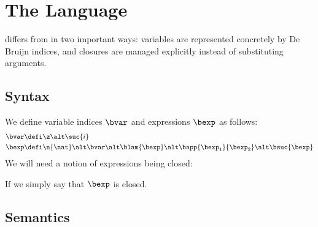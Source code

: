 \section{The \textnormal{\blang} Language}

\blang differs from \hlang in two important ways: variables are represented concretely by De Bruijn indices, and closures are managed explicitly instead of substituting arguments.


\subsection{Syntax}

We define variable indices $\bvar$ and \blang expressions $\bexp$ as follows:
\begin{align*}
	\bvar &\defi \z \alt \suc{i} \\
	\bexp &\defi \n{\nat} \alt \bvar \alt \blam{\bexp} \alt \bapp{\bexp_1}{\bexp_2} \alt \bsuc{\bexp}
\end{align*}
We will need a notion of \blang expressions being closed:



\begin{judgement}{}

\begin{prooftree}
\end{prooftree}

\begin{prooftree}
\end{prooftree}

\begin{prooftree}
\end{prooftree}

\begin{prooftree}
\end{prooftree}

\begin{prooftree}
\end{prooftree}

\end{judgement}

If  we simply say that $\bexp$ is closed.

\subsection{Semantics}

